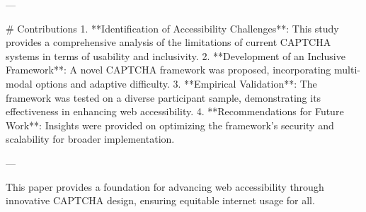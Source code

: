 ---

# Contributions  
1. **Identification of Accessibility Challenges**: This study provides a comprehensive analysis of the limitations of current CAPTCHA systems in terms of usability and inclusivity.  
2. **Development of an Inclusive Framework**: A novel CAPTCHA framework was proposed, incorporating multi-modal options and adaptive difficulty.  
3. **Empirical Validation**: The framework was tested on a diverse participant sample, demonstrating its effectiveness in enhancing web accessibility.  
4. **Recommendations for Future Work**: Insights were provided on optimizing the framework's security and scalability for broader implementation.

--- 

This paper provides a foundation for advancing web accessibility through innovative CAPTCHA design, ensuring equitable internet usage for all.